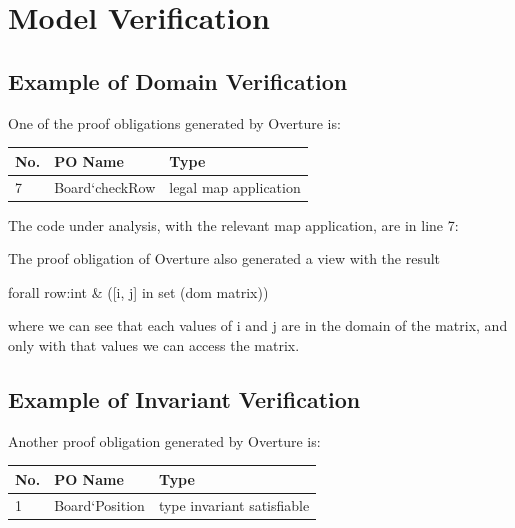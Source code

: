 \documentclass[a4paper]{article}
\begin{document}
\section{Model Verification}

\subsection{Example of Domain Verification} 

One of the proof obligations generated by Overture is:

\begin{table}[H]
	\centering
	\label{domain-verification}
	\begin{tabular}{|l|l|p{8.5cm}|}
		\hline
		No.  & PO Name & Type	\\	\hline
		7    & Board`checkRow & legal map application	\\	\hline
	\end{tabular}
\end{table}

The code under analysis, with the relevant map application, are in line 7:



The proof obligation of Overture also generated a view with the result 
\begin{center}
	forall row:int \& ([i, j] in set (dom matrix))
\end{center}
where we can see that each values of i and j are in the domain of the matrix, and only with that values we can access the matrix.
 


\subsection{Example of Invariant Verification} 

Another proof obligation generated by Overture is:

\begin{table}[H]
	\centering
	\label{invariant-verification}
	\begin{tabular}{|l|l|p{8.5cm}|}
		\hline
		No.  & PO Name & Type	\\	\hline
		1    & Board`Position & type invariant satisfiable	\\	\hline
	\end{tabular}
\end{table}
\end{document}
